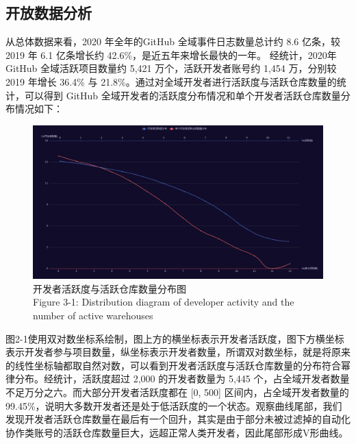 \subsection{开放数据分析}
\par 从总体数据来看，2020 年全年的GitHub 全域事件日志数量总计约 8.6 亿条，较 2019 年 6.1 亿条增长约 42.6\%，是近五年来增长最快的一年。
经统计，2020年GitHub 全域活跃项目数量约 5,421 万个，活跃开发者账号约 1,454 万，分别较 2019 年增长 36.4\% 与 21.8\%。通过对全域开发者进行活跃度与活跃仓库数量的统计，可以得到 GitHub 全域开发者的活跃度分布情况和单个开发者活跃仓库数量分布情况如下：
\begin{figure}[H]
    \centering
    \includegraphics[width=130mm]{./figures/image2-1.png}
    \caption{开发者活跃度与活跃仓库数量分布图\\Figure 3-1: Distribution diagram of developer activity and the number of active warehouses}
\end{figure}

\par 图2-1使用双对数坐标系绘制，图上方的横坐标表示开发者活跃度，图下方横坐标表示开发者参与项目数量，纵坐标表示开发者数量，所谓双对数坐标，就是将原来的线性坐标轴都取自然对数，可以看到开发者活跃度与活跃仓库数量的分布符合幂律分布。经统计，活跃度超过 2,000 的开发者数量为 5,445 个，占全域开发者数量不足万分之六。而大部分开发者活跃度都在 [0, 500] 区间内，占全域开发者数量的 99.45\%，说明大多数开发者还是处于低活跃度的一个状态。观察曲线尾部，我们发现开发者活跃仓库数量在最后有一个回升，其实是由于部分未被过滤掉的自动化协作类账号的活跃仓库数量巨大，远超正常人类开发者，因此尾部形成V形曲线。

